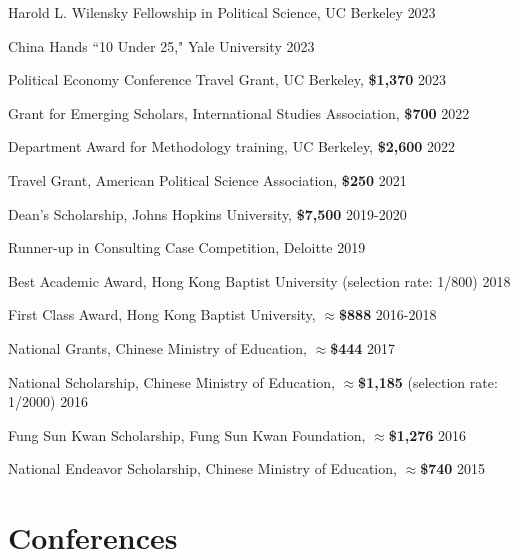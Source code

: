 \documentclass[margin,line]{res}
\begin{document}
\begin{resume}
\vspace*{-3mm}
{Harold L. Wilensky Fellowship in Political Science, UC Berkeley}  \hfill {2023}

\vspace*{-3mm}
{China Hands ``10 Under 25," Yale University}  \hfill {2023}

\vspace*{-3mm}
{Political Economy Conference Travel Grant, UC Berkeley, {\bf\$1,370}} \hfill {2023}

\vspace*{-3mm}
{Grant for Emerging Scholars, International Studies Association, {\bf\$700}} \hfill {2022}

\vspace*{-3mm}
{Department Award for Methodology training, UC Berkeley, \bf{\$2,600}} \hfill {2022}

\vspace*{-3mm}
{Travel Grant, American Political Science Association, {\bf\$250}} \hfill {2021}

\vspace*{-3mm}
{Dean's Scholarship, Johns Hopkins University, \bf{\$7,500}} \hfill {2019-2020}

\vspace*{-3mm}
{Runner-up in Consulting Case Competition, Deloitte} \hfill {2019}

\vspace*{-3mm}
{Best Academic Award, Hong Kong Baptist University (selection rate: 1/800)} \hfill {2018}

\vspace*{-3mm}
{First Class Award, Hong Kong Baptist University, \bf{$\approx$\$888}} \hfill  {2016-2018}

\vspace*{-3mm}
{National Grants, Chinese Ministry of Education, \bf{$\approx$\$444}} \hfill {2017} 

\vspace*{-3mm}
{National Scholarship, Chinese Ministry of Education, {\bf{$\approx$\$1,185}} (selection rate: 1/2000)} \hfill {2016}

\vspace*{-3mm}
{Fung Sun Kwan Scholarship, Fung Sun Kwan Foundation, \bf{$\approx$\$1,276}} \hfill {2016}

\vspace*{-3mm}
{National Endeavor Scholarship, Chinese Ministry of Education, \bf{$\approx$\$740}} \hfill {2015}

\section{\sc Conferences}


\end{resume}
\end{document}
